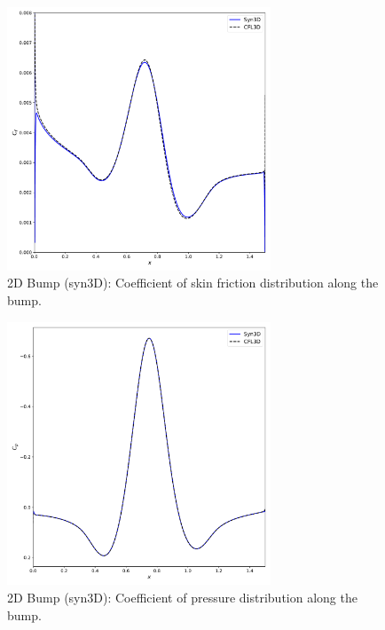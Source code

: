 \begin{figure}[ht!]
\centering
	\includegraphics[width=0.7\textwidth]{figs/2dbump/CoefficientFriction.pdf}
    \caption{2D Bump (syn3D): Coefficient of skin friction distribution along the bump.}
    \label{fig:syn2dbumpcf}
\end{figure}


\begin{figure}[ht!]
\centering
	\includegraphics[width=0.7\textwidth]{figs/2dbump/CoefficientPressure.pdf}
    \caption{2D Bump (syn3D): Coefficient of pressure distribution along the bump.}
    \label{fig:syn2dbumpcp}
\end{figure}


